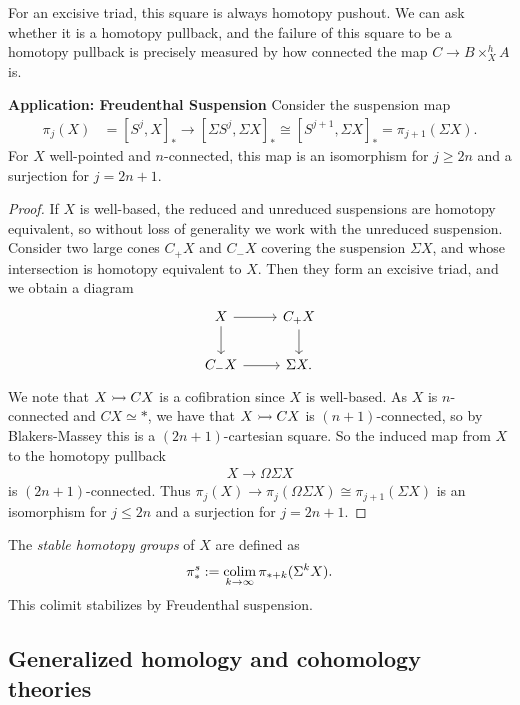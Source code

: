\documentclass{article}[11pt]
\begin{document}
For an excisive triad, this square is always homotopy pushout. We can ask whether it is a homotopy pullback, and the failure of this square to be a homotopy pullback is precisely measured by how connected the map $C\to B\times_X^h A$ is.

\textbf{Application: Freudenthal Suspension} Consider the suspension map
\begin{align*}
	\pi_j(X) &= [S^j, X]_\ast \to [\Sigma S^j, \Sigma X]_\ast \cong [S^{j+1}, \Sigma X]_\ast = \pi_{j+1}(\Sigma X).
\end{align*}
For $X$ well-pointed and $n$-connected, this map is an isomorphism for $j\geq 2n$ and a surjection for $j=2n+1$.


\begin{proof} If $X$ is well-based, the reduced and unreduced suspensions are homotopy equivalent, so without loss of generality we work with the unreduced suspension. Consider two large cones $C_+ X$ and $C_- X$ covering the suspension $\Sigma X$, and whose intersection is homotopy equivalent to $X$. Then they form an excisive triad, and we obtain a diagram
\[
	\begin{tikzcd}
	X\rar\dar & C_+ X\dar \\
	C_- X\rar & \Sigma X.
	\end{tikzcd}
\]
We note that $X\rightarrowtail CX$ is a cofibration since $X$ is well-based. As $X$ is $n$-connected and $CX\simeq\ast$, we have that $X\rightarrowtail CX$ is $(n+1)$-connected, so by Blakers-Massey this is a $(2n+1)$-cartesian square. So the induced map from $X$ to the homotopy pullback
\begin{align*}
	X\to \Omega \Sigma X
\end{align*}
is $(2n+1)$-connected. Thus $\pi_j(X) \to \pi_j(\Omega \Sigma X) \cong \pi_{j+1}(\Sigma X)$ is an isomorphism for $j\leq 2n$ and a surjection for $j=2n+1$.
\end{proof}

\begin{definition} The \textit{stable homotopy groups} of $X$ are defined as 
\begin{align*}
	\pi_\ast^s := \mathop{\operatorname*{colim}}_{k\to\infty} \pi_{\ast + k}(\Sigma^k X).
\end{align*}
This colimit stabilizes by Freudenthal suspension.
\end{definition}

\subsection{Generalized homology and cohomology theories}
\end{document}
